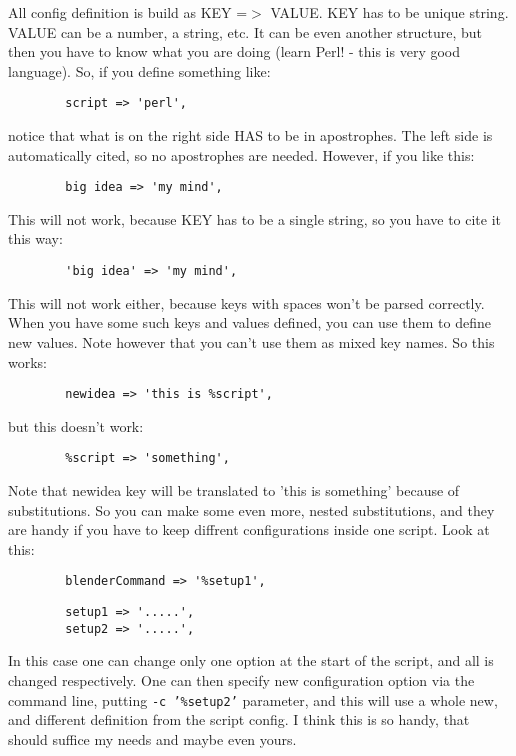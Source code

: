 \documentclass{article}
\begin{document}
All config definition is build as KEY =$>$ VALUE. KEY has to be unique string.
VALUE can be a number, a string, etc. It can be even another structure, but
then you have to know what you are doing (learn Perl! - this is very good
language).  So, if you define something like:

\begin{verbatim}
        script => 'perl',
\end{verbatim}


notice that what is on the right side HAS to be in apostrophes. The left side
is automatically cited, so no apostrophes are needed. However, if you like this:

\begin{verbatim}
        big idea => 'my mind',
\end{verbatim}


This will not work, because KEY has to be a single string, so you have to cite
it this way:

\begin{verbatim}
        'big idea' => 'my mind',
\end{verbatim}


This will not work either, because keys with spaces won't be parsed correctly.
When you have some such keys and values defined, you can use them to define new 
values. Note however that you can't use them as mixed key names. So this works:

\begin{verbatim}
        newidea => 'this is %script',
\end{verbatim}


but this doesn't work:

\begin{verbatim}
        %script => 'something',
\end{verbatim}


Note that newidea key will be translated to 'this is something' because of
substitutions.  So you can make some even more, nested substitutions, and they
are handy if you have to keep diffrent configurations inside one script. Look
at this:

\begin{verbatim}
        blenderCommand => '%setup1',
\end{verbatim}
\begin{verbatim}
        setup1 => '.....',
        setup2 => '.....',
\end{verbatim}


In this case one can change only one option at the start of the script, and all
is changed respectively. One can then specify new configuration option via the
command line, putting \texttt{-c '\%setup2'} parameter, and this will use a whole new,
and different definition from the script config. I think this is so handy, that
should suffice my needs and maybe even yours.
\end{document}
